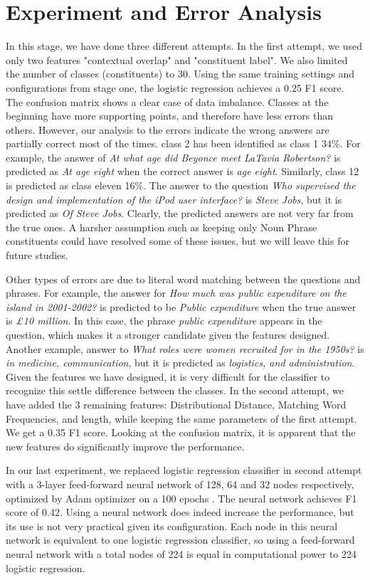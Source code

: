 \section{Experiment and Error Analysis}
In this stage, we have done three different attempts. 
In the first attempt, we used only two features "contextual overlap" and "constituent label". We also limited the number of classes (constituents) to 30. Using the same training settings and configurations from stage one, the logistic regression achieves a 0.25 F1 score. The confusion matrix shows a clear case of data imbalance. Classes at the beginning have more supporting points, and therefore have less errors than others. However, our analysis to the errors indicate the wrong answers are partially correct most of the times. class 2 has been identified as class 1 34\%. For example, the answer of \emph{At what age did Beyonce meet LaTavia Robertson? }is predicted as \emph{At age eight} when the correct answer is \emph{age eight}. Similarly, class 12 is predicted as class eleven 16\%. The answer to the question \emph{Who supervised the design and implementation of the iPod user interface?} is \emph{Steve Jobs}, but it is predicted as \emph{Of Steve Jobs}. Clearly, the predicted answers are not very far from the true ones. A harsher assumption such as keeping only Noun Phrase constituents could have resolved some of these issues, but we will leave this for future studies. 

Other types of errors are due to literal word matching between the questions and phrases. For example, the answer for \emph{How much was public expenditure on the island in 2001-2002?} is predicted to be \emph{Public expenditure} when the true answer is \emph{£10 million}. In this case, the phrase \emph{public expenditure} appears in the question, which makes it a stronger candidate given the features designed. Another example, answer to \textit{What roles were women recruited for in the 1950s?} is \emph{in medicine, communication}, but it is predicted as \emph{logistics, and administration}. Given the features we have designed, it is very difficult for the classifier to recognize this settle difference between the classes. 
In the second attempt, we have added the 3 remaining features: Distributional Distance, Matching Word Frequencies, and length, while keeping the same parameters of the first attempt. We get a 0.35 F1 score. Looking at the confusion matrix, it is apparent that the new features do significantly improve the performance.

In our last experiment, we replaced logistic regression classifier in second attempt with a 3-layer feed-forward neural network of 128, 64 and 32 nodes respectively, optimized by Adam optimizer on a 100 epochs . The neural network achieves F1 score of 0.42. Using a neural network does indeed increase the performance, but its use is not very practical given its configuration. Each node in this neural network is equivalent to one logistic regression classifier, so using a feed-forward neural network with a total nodes of 224 is equal in computational power to 224 logistic regression. 

